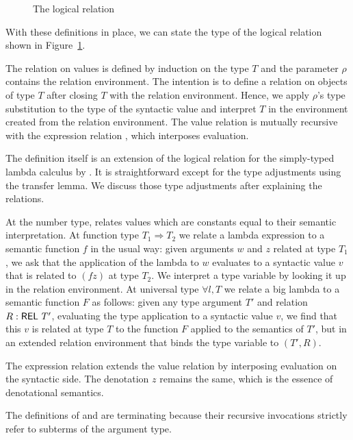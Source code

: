 \documentclass[acmsmall,anonymous,review,screen]{acmart}
\begin{document}
\begin{figure}[tp]
  \begin{flushleft}
    \LogicalMCVType \LogicalMCVBody \LogicalMCE
  \end{flushleft}
\caption{The logical relation}
  \label{fig:logical-relation}
\end{figure}
With these definitions in place, we can state the type of the logical
relation shown in Figure~\ref{fig:logical-relation}.

The  relation {\AVSem} on values is defined by induction on the type $T$ and the parameter
$\rho$ contains the relation environment. The intention is to define a
relation on objects of type $T$ after closing $T$ with the relation
environment. Hence, we apply $\rho$'s type substitution to the type of
the syntactic value and interpret $T$ in the environment created from
the relation environment.
The value relation is mutually recursive with the expression relation
{\AESem}, which interposes evaluation.

The definition itself is an extension of the logical relation for the
simply-typed lambda calculus by
\citet{DBLP:journals/jar/BentonHKM12}. It is straightforward
except for the type adjustments using the transfer lemma. We
discuss those type adjustments after explaining the relations.

At the number type, {\AVSem} relates values which are constants equal to their semantic
interpretation. 
At function type $T_1 \Rightarrow T_2$ we relate a lambda expression
to a semantic function $f$ in
the usual way: given arguments $w$ and $z$ related at type $T_1$, we ask that the
application of the lambda to $w$ evaluates to a syntactic value $v$ that is
related to $(f z)$ at type $T_2$.
We interpret a type variable by looking it up in the relation
environment.
At universal type $\forall l, T$ we relate a big lambda to a semantic
function $F$ as follows: given any type argument $T'$ and relation $R :
\AREL\ T'$, evaluating the type application to a syntactic value $v$,
we find that this $v$ is related at type $T$ to the
function $F$ applied to the semantics of $T'$, but in an extended
relation environment that binds the type variable to $(T', R)$.

The expression relation {\AESem}  extends the value relation by interposing
evaluation on the syntactic side. The denotation $z$ remains the
same, which is the essence of denotational semantics. 


The definitions of {\AVSem} and {\AESem} are terminating because their
recursive invocations strictly refer to subterms of the argument type.
\end{document}
